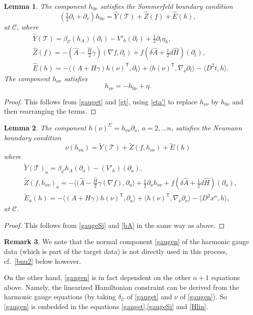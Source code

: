 \documentclass[10pt]{amsart}
\renewcommand{\b}{\beta}
\newcommand{\g}{\gamma}
\renewcommand{\d}{\delta}
\newcommand{\Si}{\Sigma}
\newcommand{\cC}{{\mathcal C}}
\newcommand{\cT}{{\mathcal T}}
\newcommand{\tT}{\mathsf{T}}
\newcommand{\be}{\begin{equation}}
\newcommand{\ee}{\end{equation}}
\newcommand{\p}{\partial}
\renewcommand{\hat}{\widehat}
\newcommand{\<}{\langle}
\renewcommand{\>}{\rangle}
\newcommand{\w}{\widetilde}
\theoremstyle{plain}
\newtheorem{lemma}{Lemma}[section]
\theoremstyle{remark}
\theoremstyle{definition}
\newtheorem{remark}[lemma]{Remark}
\numberwithin{equation}{section}
\begin{document}
\begin{lemma}
The component $h_{0\nu}$ satisfies the Sommerfeld boundary condition 
\be \label{h01}
(\tfrac{1}{2}\p_t + \p_{\nu})h_{0\nu} = \hat Y(\cT) + \hat Z(f) + \hat E(h),
\ee
at $\cC$, where 
\be \label{h01terms}
\begin{split}
&\hat Y(\cT) =    \b_{\cC}(h_A)(\p_t) - V'_h(\p_t) + \tfrac{1}{2}\p_t \eta_h, \\
&\hat Z(f) = - (\hat A - \tfrac{\hat H}{2}\g)(\nabla f, \p_t) + f(\d \hat A + \tfrac{1}{2}d\hat H)(\p_t), \\ 
&\hat E(h) =  -\<(A + H\g)h(\nu)^{\tT}, \p_t\>  + \<h(\nu)^{\tT}, \nabla_{\nu}\p_t\> - \<D^2t, h\>.
\end{split}
\ee 
The component $h_{\nu \nu}$ satisfies 
$$h_{\nu \nu} = -h_{0\nu} + \eta.$$ 
\end{lemma}

\begin{proof}
  This follows from \eqref{gauget} and \eqref{gt}, using \eqref{eta'} to replace $h_{\nu \nu}$ by $h_{0\nu}$ and then rearranging the terms. 
 
 \end{proof}

\begin{lemma}
The component $h(\nu)^{\Si} = h_{\nu a} \p_a$, $a = 2, \dots n$, satisfies the Neumann boundary condition 
\be \label{hnua}
\nu (h_{\nu a}) = \w Y(\cT) + \w Z(f, h_{\nu \nu}) + \w E(h)
\ee
where 
\be \label{hnuaterms}
\begin{split}
&\w Y(\cT)_a = \b_{\cC}h_A(\p_a) - (V'_h)(\p_a),\\
&\w Z(f, h_{\nu \nu})_a = -\<(\hat A -\tfrac{\hat H}{2}\g(\nabla f), \p_a\> + \tfrac{1}{2}\p_a h_{\nu \nu} + f(\d \hat A + \tfrac{1}{2}d\hat H)(\p_a), \\ 
&\w E_a(h) =  -\<(A + H\g)h(\nu)^{\tT}, \p_a\>  + \<h(\nu)^{\tT}, \nabla_{\nu}\p_a\> - \<D^2 x^a, h\>,
\end{split}
\ee 
at $\cC$. 
\end{lemma}

\begin{proof}
This follows from \eqref{gaugeSi} and \eqref{bA} in the same way as above. 

\end{proof}

\begin{remark}
{\rm We note that the normal component \eqref{gaugen} of the harmonic gauge data (which is part of the target data) is not directly used in this 
process, cf.~\eqref{bnu2} below however. 
 
 On the other hand, \eqref{gaugen} is in fact dependent on the other $n+1$ equations above. Namely, the linearized Hamiltonian 
 constraint can be derived from the harmonic gauge equations (by taking $\d_{\cC}$ of \eqref{gauget} and $\nu$ of \eqref{gaugen}). So \eqref{gaugen} is 
embedded in the equations \eqref{gauget},\eqref{gaugeSi} and \eqref{Hlin}. 
 }
  \end{remark} 
  
\end{document}
